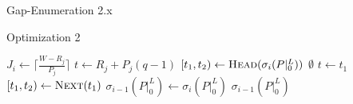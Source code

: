 \documentclass{beamer}
\begin{document}
\begin{section}{Gap-Enumeration 2.x}
\begin{frame}{Optimization 2}
    \begin{algorithm}[H]
    \begin{multicols}{2}
      {\tiny
      \begin{algorithmic}[2]
          \State $J_{i} \gets \lceil\frac{W - R_{j}}{P_{j}}\rceil$
            \State $t \gets R_{j} + P_{j}(q-1)$
            \State $[t_{1},t_{2}) \gets \Call{Head}{\sigma_{i}(P|_{0}^{L})}$
            \While{$[t_{1},t_{2}) \not= \Call{Tail}{\sigma_{i}(P|_{0}^{L})}$}
                \State \Return $\emptyset$
              \EndIf
                \State $t \gets t_{1}$
              \EndIf
                    \State {$[t_{1},t_{2}) \gets [t_{1},t)$}
                  \Else
                    \State {\Call{Splice-Out}{$\sigma_{i}(P|_{0}^{L}), [t_{1},t_{2})$}}
                  \EndIf
                    \ExitWhile
                  \EndIf
                \EndIf
                    \State {$[t_{1},t_{2}) \gets [t + C_{j},t_{2})$}
                      \State \Call{Splice-In}{$\sigma_{i}(P|_{0}^{L}), [t_{1},t)$}
                    \EndIf
                  \ExitWhile
                \EndIf
              \EndIf
              \State $[t_{1},t_{2}) \gets \Call{Next}{t_{1}}$
            \EndWhile
          \EndFor
          \State $\sigma_{i-1}(P|_{0}^{L}) \gets \sigma_{i}(P|_{0}^{L})$
          \State \Return $\sigma_{i-1}(P|_{0}^{L})$
        \EndFunction
      \end{algorithmic}
    }
    \end{multicols}
  \end{algorithm}
\end{frame}


\end{section}
\end{document}
